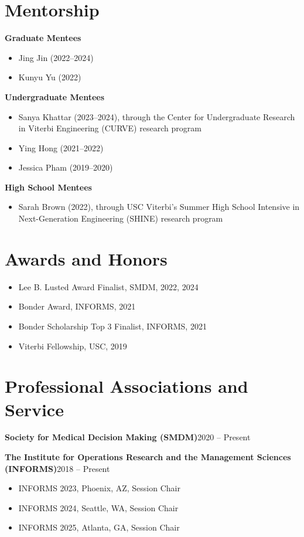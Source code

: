 \documentclass[11pt,letterpaper]{article}
\newcommand{\entry}[2]{\textbf{#1}\hfill #2\par}
\begin{document}
\section{Mentorship}
\textbf{Graduate Mentees}
\begin{itemize}
  \item Jing Jin (2022--2024)
  \item Kunyu Yu (2022)
\end{itemize}
\textbf{Undergraduate Mentees}
\begin{itemize}
  \item Sanya Khattar (2023--2024), through the Center for Undergraduate Research in Viterbi Engineering (CURVE)
        research program
  \item Ying Hong (2021--2022)
  \item Jessica Pham (2019--2020)
\end{itemize}
\textbf{High School Mentees}
\begin{itemize}
  \item Sarah Brown (2022), through USC Viterbi's Summer High School Intensive in Next-Generation Engineering
        (SHINE) research program
\end{itemize}

\section{Awards and Honors}
\begin{itemize}
  \item Lee B. Lusted Award Finalist, SMDM, 2022, 2024
  \item Bonder Award, INFORMS, 2021
  \item Bonder Scholarship Top 3 Finalist, INFORMS, 2021
  \item Viterbi Fellowship, USC, 2019
\end{itemize}

\section{Professional Associations and Service}
\entry{Society for Medical Decision Making (SMDM)}{2020 -- Present}
\entry{The Institute for Operations Research and the Management Sciences (INFORMS)}{2018 -- Present}
\begin{itemize}
  \item INFORMS 2023, Phoenix, AZ, Session Chair
  \item INFORMS 2024, Seattle, WA, Session Chair
  \item INFORMS 2025, Atlanta, GA, Session Chair
\end{itemize}
\end{document}

